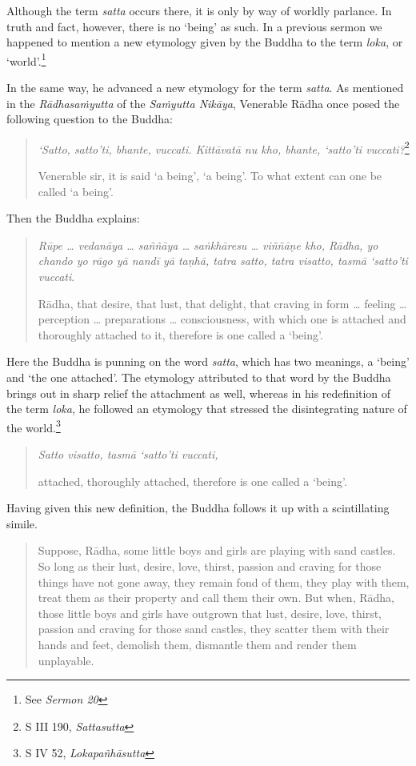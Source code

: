 Although the term \emph{satta} occurs there, it is only by way of worldly parlance. In truth and fact, however, there is no `being' as such. In a previous sermon we happened to mention a new etymology given by the Buddha to the term \emph{loka}, or `world'.\footnote{See \emph{Sermon 20}}

In the same way, he advanced a new etymology for the term \emph{satta}. As mentioned in the \emph{Rādhasaṁyutta} of the \emph{Saṁyutta Nikāya}, Venerable Rādha once posed the following question to the Buddha:

\begin{quote}
\emph{`Satto, satto'ti, bhante, vuccati. Kittāvatā nu kho, bhante, `satto'ti vuccati?}\footnote{S III 190, \emph{Sattasutta}}

Venerable sir, it is said `a being', `a being'. To what extent can one be called `a being'.
\end{quote}

Then the Buddha explains:

\begin{quote}
\emph{Rūpe \ldots{} vedanāya \ldots{} saññāya \ldots{} saṅkhāresu \ldots{} viññāṇe kho, Rādha, yo chando yo rāgo yā nandī yā taṇhā, tatra satto, tatra visatto, tasmā `satto'ti vuccati}.

Rādha, that desire, that lust, that delight, that craving in form \ldots{} feeling \ldots{} perception \ldots{} preparations \ldots{} consciousness, with which one is attached and thoroughly attached to it, therefore is one called a `being'.
\end{quote}

Here the Buddha is punning on the word \emph{satta}, which has two meanings, a `being' and `the one attached'. The etymology attributed to that word by the Buddha brings out in sharp relief the attachment as well, whereas in his redefinition of the term \emph{loka}, he followed an etymology that stressed the disintegrating nature of the world.\footnote{S IV 52, \emph{Lokapañhāsutta}}

\begin{quote}
\emph{Satto visatto, tasmā `satto'ti vuccati,}

attached, thoroughly attached, therefore is one called a `being'.
\end{quote}

Having given this new definition, the Buddha follows it up with a scintillating simile.

\begin{quote}
Suppose, Rādha, some little boys and girls are playing with sand castles. So long as their lust, desire, love, thirst, passion and craving for those things have not gone away, they remain fond of them, they play with them, treat them as their property and call them their own. But when, Rādha, those little boys and girls have outgrown that lust, desire, love, thirst, passion and craving for those sand castles, they scatter them with their hands and feet, demolish them, dismantle them and render them unplayable.
\end{quote}

